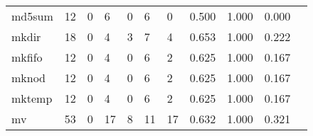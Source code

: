 \begin{longtable}{lp{1.2cm}p{1.2cm}p{1.2cm}p{1.2cm}p{1.2cm}p{1.2cm}p{1.2cm}p{1.2cm}p{1.2cm}p{1.2cm}}
md5sum    &                                    12 &                                                  0 &                                                  6 &                                                  0 &                                                  6 &                                                  0 &                                         0.500 &                                              1.000 &                                              0.000 \\
mkdir     &                                    18 &                                                  0 &                                                  4 &                                                  3 &                                                  7 &                                                  4 &                                         0.653 &                                              1.000 &                                              0.222 \\
mkfifo    &                                    12 &                                                  0 &                                                  4 &                                                  0 &                                                  6 &                                                  2 &                                         0.625 &                                              1.000 &                                              0.167 \\
mknod     &                                    12 &                                                  0 &                                                  4 &                                                  0 &                                                  6 &                                                  2 &                                         0.625 &                                              1.000 &                                              0.167 \\
mktemp    &                                    12 &                                                  0 &                                                  4 &                                                  0 &                                                  6 &                                                  2 &                                         0.625 &                                              1.000 &                                              0.167 \\
mv        &                                    53 &                                                  0 &                                                 17 &                                                  8 &                                                 11 &                                                 17 &                                         0.632 &                                              1.000 &                                              0.321 \\

\end{longtable}
